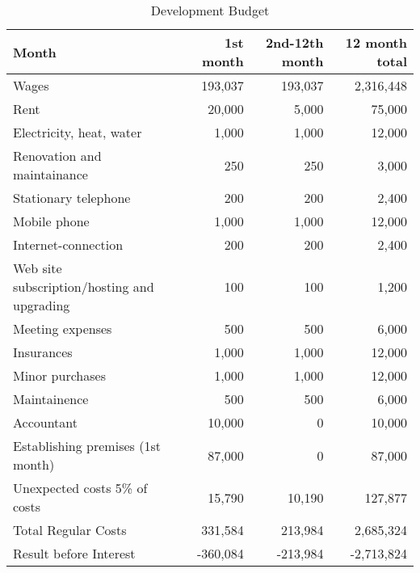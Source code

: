 \begin{table}[h]
\begin{tabular}{l *{3}{r}}
Month                                               &  1st month& 2nd-12th month& 12 month total\\ \hline
Wages                                               &  193,037	& 193,037       & 2,316,448    \\
Rent                                                &  20,000	& 5,000	        & 75,000       \\
Electricity, heat, water                            &  1,000	& 1,000	        & 12,000       \\
Renovation and maintainance                         &  250	& 250	        & 3,000        \\
Stationary telephone                                &  200	& 200	        & 2,400        \\
Mobile phone                                        &  1,000	& 1,000	        & 12,000       \\
Internet-connection                                 &  200	& 200	        & 2,400        \\
Web site subscription/hosting and upgrading         &  100	& 100	        & 1,200        \\
Meeting expenses                                    &  500	& 500	        & 6,000        \\
Insurances                                          &  1,000	& 1,000	        & 12,000       \\
Minor purchases                                     &  1,000	& 1,000	        & 12,000       \\
Maintainence                                        &  500	& 500	        & 6,000        \\
Accountant                                          &  10,000	& 0	        & 10,000       \\
Establishing premises (1st month)                   &  87,000	& 0	        & 87,000       \\
Unexpected costs 5\% of costs                       &  15,790	& 10,190	& 127,877      \\
Total Regular Costs                                 &  331,584	& 213,984	& 2,685,324    \\
Result before Interest                              &  -360,084	& -213,984	& -2,713,824   \\
\end{tabular}
\caption{Development Budget}
\end{table}

